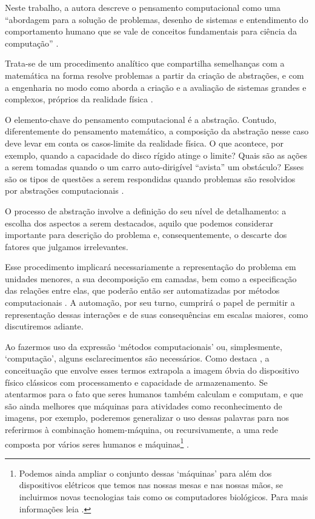 Neste trabalho, a autora descreve o pensamento computacional como uma ``abordagem para a solução de problemas, desenho de sistemas e entendimento do comportamento humano que se vale de conceitos fundamentais para ciência da computação'' \cite[tradução nossa]{wing2006}.

Trata-se de um procedimento analítico que compartilha semelhanças com a matemática na forma resolve problemas a partir da criação de abstrações, e com a engenharia no modo como aborda a criação e a avaliação de sistemas grandes e complexos, próprios da realidade física \cite[p.~3717]{wing2008}.

O elemento-chave do pensamento computacional é a abstração. Contudo, diferentemente do pensamento matemático, a composição da abstração nesse caso deve levar em conta os casos-limite da realidade física. O que acontece, por exemplo, quando a capacidade do disco rígido atinge o limite? Quais são as ações a serem tomadas quando o um carro auto-dirigível ``avista'' um obstáculo? Esses são os tipos de questões a serem respondidas quando problemas são resolvidos por abstrações computacionais \cite[p.~3718]{wing2008}.

O processo de abstração involve a definição do seu nível de detalhamento: a escolha dos aspectos a serem destacados, aquilo que podemos considerar importante para descrição do problema e, consequentemente, o descarte dos fatores que julgamos irrelevantes. 

Esse procedimento implicará necessariamente a representação do problema em unidades menores, a sua decomposição em camadas, bem como a especificação das relações entre elas, que poderão então ser automatizadas por métodos computacionais \cite[p.~3718]{wing2008}. A automação, por seu turno, cumprirá o papel de permitir a representação dessas interações e de suas consequências em escalas maiores, como discutiremos adiante.



Ao fazermos uso da expressão `métodos computacionais' ou, simplesmente, `computação', alguns esclarecimentos são necessários. Como destaca , a conceituação que envolve esses termos extrapola a imagem óbvia do dispositivo físico clássicos com processamento e capacidade de armazenamento. Se atentarmos para o fato que seres humanos também calculam e computam, e que são ainda melhores que máquinas para atividades como reconhecimento de imagens, por exemplo, poderemos generalizar o uso dessas palavras para nos referirmos à combinação homem-máquina, ou recursivamente, a uma rede composta por vários seres humanos e máquinas\footnote{Podemos ainda ampliar o conjunto dessas `máquinas' para além dos dispositivos elétricos que temos nas nossas mesas e nas nossas mãos, se incluirmos novas tecnologias tais como os computadores biológicos. Para mais informações leia .} \cite[p.~3718-19]{wing2008}.



